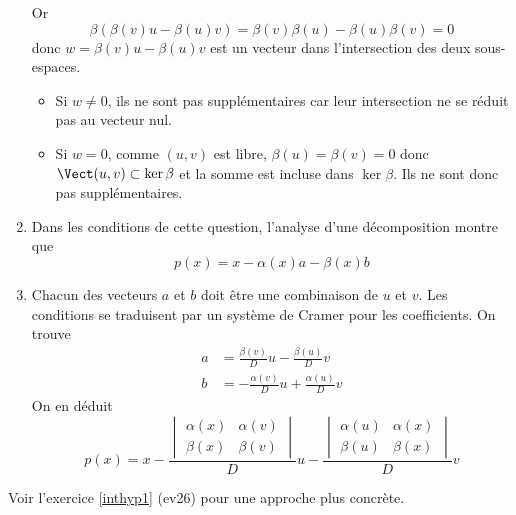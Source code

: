 \begin{enumerate}
Or
\begin{displaymath}
  \beta\left( \beta(v)u-\beta(u)v\right) = \beta(v)\beta(u)-\beta(u)\beta(v)=0 
\end{displaymath}
donc $w=\beta(v)u-\beta(u)v$ est un vecteur dans l'intersection des deux sous-espaces.
\begin{itemize}
  \item Si $w\neq 0$, ils ne sont pas supplémentaires car leur intersection ne se réduit pas au vecteur nul.
  \item Si $w=0$, comme $(u,v)$ est libre, $\beta(u)=\beta(v)=0$ donc $\Vect(u,v)\subset \ker \beta$ et la somme est incluse dans $\ker \beta$. Ils ne sont donc pas supplémentaires. 
\end{itemize}

  \item Dans les conditions de cette question, l'analyse d'une décomposition montre que 
\begin{displaymath}
  p(x) = x -\alpha(x)a - \beta(x)b
\end{displaymath}

  \item Chacun des vecteurs $a$ et $b$ doit être une combinaison de $u$ et $v$. Les conditions se traduisent par un système de Cramer pour les coefficients. On trouve
\begin{align*}
  a &= \frac{\beta(v)}{D}u -\frac{\beta(u)}{D} v\\
  b &= -\frac{\alpha(v)}{D}u +\frac{\alpha(u)}{D} v
\end{align*}
On en déduit
\begin{displaymath}
p(x) = x -
\frac{
\begin{vmatrix}
  \alpha(x) & \alpha(v) \\ \beta(x) & \beta(v)
\end{vmatrix}
}{D}u -
\frac{
\begin{vmatrix}
  \alpha(u) & \alpha(x) \\ \beta(u) & \beta(x)
\end{vmatrix}
}{D}v
\end{displaymath}
\end{enumerate}
Voir l'exercice \ref{inthyp1} (ev26) pour une approche plus concrète.
